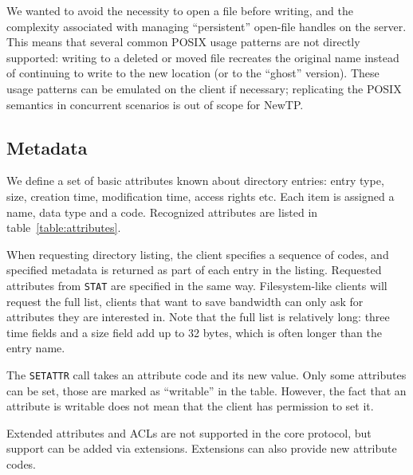 We wanted to avoid the necessity to open a file before writing, and the complexity associated with managing
``persistent'' open-file handles on the server. This means that several common POSIX usage patterns are not
directly supported: writing to a deleted or moved file recreates the original name instead of continuing to
write to the new location (or to the ``ghost'' version). These usage patterns can be emulated on the client if
necessary; replicating the POSIX semantics in concurrent scenarios is out of scope for NewTP.

%

\subsection{Metadata}

We define a set of basic attributes known about directory entries: entry type, size, creation time,
modification time, access rights etc. Each item is assigned a name, data type and a code. Recognized
attributes are listed in table~\ref{table:attributes}.

When requesting directory listing, the client specifies a sequence of codes, and specified metadata is
returned as part of each entry in the listing. Requested attributes from {\tt STAT} are specified in the same
way. Filesystem-like clients will request the full list, clients that want to save bandwidth can only ask for
attributes they are interested in.  Note that the full list is relatively long: three time fields and a size
field add up to 32 bytes, which is often longer than the entry name.

The {\tt SETATTR} call takes an attribute code and its new value. Only some attributes can be set, those are
marked as ``writable'' in the table. However, the fact that an attribute is writable does not mean that the
client has permission to set it.

Extended attributes and ACLs are not supported in the core protocol, but support can be added via extensions.
Extensions can also provide new attribute codes.

